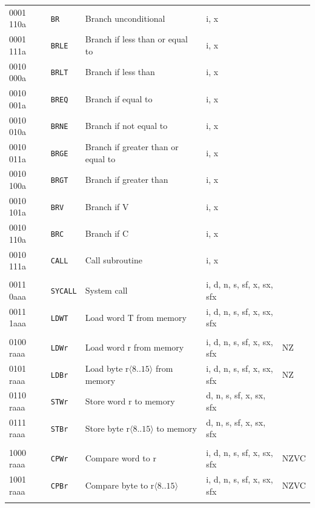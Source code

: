 \documentclass[10pt,fleqn]{book}
\begin{document}
\begin{tabular}{ l l l l l }
0001 110a   & \verb|BR|      & Branch unconditional                        & i, x \\
0001 111a   & \verb|BRLE|    & Branch if less than or equal to             & i, x \\ 
0010 000a   & \verb|BRLT|    & Branch if less than                         & i, x \\
0010 001a   & \verb|BREQ|    & Branch if equal to                          & i, x \\ 
0010 010a   & \verb|BRNE|    & Branch if not equal to                      & i, x \\ 
0010 011a   & \verb|BRGE|    & Branch if greater than or equal to          & i, x \\ 
0010 100a   & \verb|BRGT|    & Branch if greater than                      & i, x \\ 
0010 101a   & \verb|BRV|     & Branch if V                                 & i, x \\ 
0010 110a   & \verb|BRC|     & Branch if C                                 & i, x \\ 
0010 111a   & \verb|CALL|    & Call subroutine                             & i, x \\ 
 \\
0011 0aaa   & \verb|SYCALL|  & System call                                 & i, d, n, s, sf, x, sx, sfx \\
0011 1aaa   & \verb|LDWT|    & Load word T from memory                     & i, d, n, s, sf, x, sx, sfx \\
 \\
0100 raaa   & \verb|LDWr|    & Load word r from memory                     & i, d, n, s, sf, x, sx, sfx  & NZ \\
0101 raaa   & \verb|LDBr|    & Load byte r$\langle8..15\rangle$ from memory& i, d, n, s, sf, x, sx, sfx  & NZ \\
0110 raaa   & \verb|STWr|    & Store word r to memory                      & d, n, s, sf, x, sx, sfx \\
0111 raaa   & \verb|STBr|    & Store byte r$\langle8..15\rangle$ to memory & d, n, s, sf, x, sx, sfx \\
\\
1000 raaa   & \verb|CPWr|    & Compare word to r                           & i, d, n, s, sf, x, sx, sfx  & NZVC \\
1001 raaa   & \verb|CPBr|    & Compare byte to r$\langle8..15\rangle$      & i, d, n, s, sf, x, sx, sfx  & NZVC \\
 \\

\end{tabular}
\end{document}
